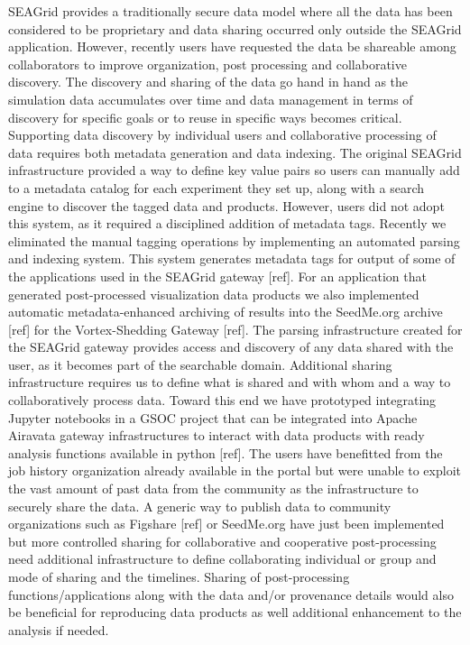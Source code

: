 \documentclass[sigconf]{acmart}
\begin{document}
SEAGrid provides a traditionally secure data model where all the data has been considered to be proprietary and data sharing occurred only outside the SEAGrid application. However, recently users have requested the data be shareable among collaborators to improve organization, post processing and collaborative discovery. The discovery and sharing of the data go hand in hand as the simulation data accumulates over time and data management in terms of discovery for specific goals or to reuse in specific ways becomes critical. Supporting data discovery by individual users and collaborative processing of data requires both metadata generation and data indexing. The original SEAGrid infrastructure provided a way to define key value pairs so users can manually add to a metadata catalog for each experiment they set up, along with a search engine to discover the tagged data and products. However, users did not adopt this system, as it required a disciplined addition of metadata tags.  
Recently we eliminated the manual tagging operations by implementing an automated parsing and indexing system. This system generates metadata tags for output of some of the applications used in the SEAGrid gateway [ref]. For an application that generated post-processed visualization data products we also implemented automatic metadata-enhanced archiving of results into the SeedMe.org archive [ref] for the Vortex-Shedding Gateway [ref]. The parsing infrastructure created for the SEAGrid gateway provides access and discovery of any data shared with the user, as it becomes part of the searchable domain. Additional sharing infrastructure requires us to define what is shared and with whom and a way to collaboratively process data. Toward this end we have prototyped integrating Jupyter notebooks in a GSOC project that can be integrated into Apache Airavata gateway infrastructures to interact with data products with ready analysis functions available in python [ref].   
The users have benefitted from the job history organization already available in the portal but were unable to exploit the vast amount of past data from the community as the infrastructure to securely share the data. A generic way to publish data to community organizations such as Figshare [ref] or SeedMe.org have just been implemented but more controlled sharing for collaborative and cooperative post-processing need additional infrastructure to define collaborating individual or group and mode of sharing and the timelines. Sharing of post-processing functions/applications along with the data and/or provenance details would also be beneficial for reproducing data products as well additional enhancement to the analysis if needed.
\end{document}
